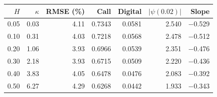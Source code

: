 \begin{tabular}{rrrrrrr}
\toprule
$H$ & $\kappa$ & RMSE (\%) & Call & Digital & $|\psi(0.02)|$ & Slope\\
\midrule
0.05 & 0.03 & 4.11 & 0.7343 & 0.0581 & 2.540 & $-$0.529\\
0.10 & 0.31 & 4.03 & 0.7218 & 0.0568 & 2.478 & $-$0.512\\
0.20 & 1.06 & 3.93 & 0.6966 & 0.0539 & 2.351 & $-$0.476\\
0.30 & 2.18 & 3.93 & 0.6715 & 0.0509 & 2.220 & $-$0.436\\
0.40 & 3.83 & 4.05 & 0.6478 & 0.0476 & 2.083 & $-$0.392\\
0.50 & 6.27 & 4.29 & 0.6268 & 0.0442 & 1.933 & $-$0.343\\
\bottomrule
\end{tabular}
